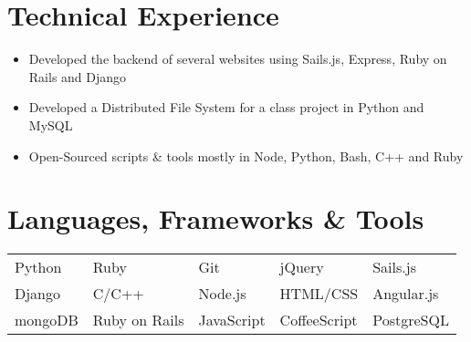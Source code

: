 \documentclass[print]{friggeri-cv} %
\begin{document}

\section{Technical Experience}
\begin{itemize}\small
\item Developed the backend of several websites using Sails.js, Express, Ruby on Rails and Django
\item Developed a Distributed File System for a class project in Python and MySQL
\item Open-Sourced scripts \& tools mostly in Node, Python, Bash, C++ and Ruby\\
\end{itemize}



\section{Languages, Frameworks \& Tools}

\setlength{\tabcolsep}{20pt}

\small
\begin{tabular}{lllll}
    Python   & Ruby           & Git    & jQuery   & Sails.js \\
    Django   & C/C++  & Node.js        & HTML/CSS    & Angular.js   \\
    mongoDB  & Ruby on Rails          & JavaScript & CoffeeScript & PostgreSQL
\end{tabular}



\end{document}
